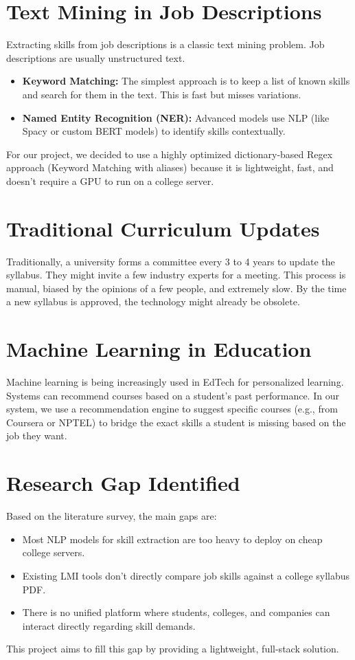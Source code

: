 \documentclass[12pt,a4paper]{report}
\begin{document}
\section{Text Mining in Job Descriptions}
Extracting skills from job descriptions is a classic text mining problem. Job descriptions are usually unstructured text. 
\begin{itemize}
    \item \textbf{Keyword Matching:} The simplest approach is to keep a list of known skills and search for them in the text. This is fast but misses variations.
    \item \textbf{Named Entity Recognition (NER):} Advanced models use NLP (like Spacy or custom BERT models) to identify skills contextually. 
\end{itemize}
For our project, we decided to use a highly optimized dictionary-based Regex approach (Keyword Matching with aliases) because it is lightweight, fast, and doesn't require a GPU to run on a college server.

\section{Traditional Curriculum Updates}
Traditionally, a university forms a committee every 3 to 4 years to update the syllabus. They might invite a few industry experts for a meeting. This process is manual, biased by the opinions of a few people, and extremely slow. By the time a new syllabus is approved, the technology might already be obsolete. 

\section{Machine Learning in Education}
Machine learning is being increasingly used in EdTech for personalized learning. Systems can recommend courses based on a student's past performance. In our system, we use a recommendation engine to suggest specific courses (e.g., from Coursera or NPTEL) to bridge the exact skills a student is missing based on the job they want.

\section{Research Gap Identified}
Based on the literature survey, the main gaps are:
\begin{itemize}
    \item Most NLP models for skill extraction are too heavy to deploy on cheap college servers.
    \item Existing LMI tools don't directly compare job skills against a college syllabus PDF.
    \item There is no unified platform where students, colleges, and companies can interact directly regarding skill demands.
\end{itemize}
This project aims to fill this gap by providing a lightweight, full-stack solution.
\end{document}
